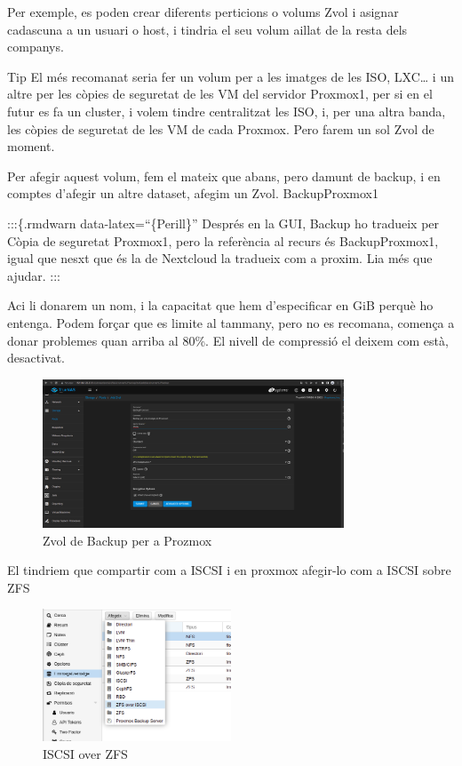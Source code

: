 \documentclass[
  10pt,
]{krantz}
\begin{document}
Per exemple, es poden crear diferents perticions o volums Zvol i asignar cadascuna a un usuari o host, i tindria el seu volum aillat de la resta dels companys.

\begin{rmdtip}{Tip}
El més recomanat seria fer un volum per a les imatges de les ISO, LXC\ldots{} i un altre per les còpies de seguretat de les VM del servidor Proxmox1, per si en el futur es fa un cluster, i volem tindre centralitzat les ISO, i, per una altra banda, les còpies de seguretat de les VM de cada Proxmox. Pero farem un sol Zvol de moment.

\end{rmdtip}

Per afegir aquest volum, fem el mateix que abans, pero damunt de backup, i en comptes d'afegir un altre dataset, afegim un Zvol. BackupProxmox1

:::\{.rmdwarn data-latex=``\{Perill\}'' Després en la GUI, Backup ho tradueix per Còpia de seguretat Proxmox1, pero la referència al recurs és BackupProxmox1, igual que nesxt que és la de Nextcloud la tradueix com a proxim. Lia més que ajudar. :::

Aci li donarem un nom, i la capacitat que hem d'especificar en GiB perquè ho entenga. Podem forçar que es limite al tammany, pero no es recomana, comença a donar problemes quan arriba al 80\%. El nivell de compressió el deixem com està, desactivat.

\begin{figure}
\centering
\includegraphics[width=0.8\textwidth,height=\textheight]{imatges/proxmox/Zvol_backup.png}
\caption{Zvol de Backup per a Prozmox}
\end{figure}

El tindriem que compartir com a ISCSI i en proxmox afegir-lo com a ISCSI sobre ZFS

\begin{figure}
\centering
\includegraphics[width=0.5\textwidth,height=\textheight]{imatges/proxmox/ISCSI_ZFS.png}
\caption{ISCSI over ZFS}
\end{figure}
\end{document}
